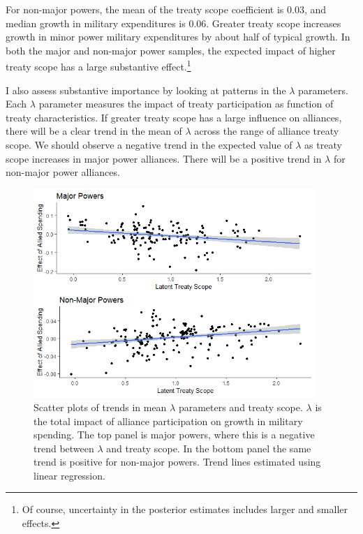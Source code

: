 \documentclass[12pt]{article}
\begin{document}
For non-major powers, the mean of the treaty scope coefficient is 0.03, and median growth in military expenditures is 0.06. 
Greater treaty scope increases growth in minor power military expenditures by about half of typical growth. 
In both the major and non-major power samples, the expected impact of higher treaty scope has a large substantive effect.\footnote{Of course, uncertainty in the posterior estimates includes larger and smaller effects.}


I also assess substantive importance by looking at patterns in the $\lambda$ parameters. 
Each $\lambda$ parameter measures the impact of treaty participation as function of treaty characteristics. 
If greater treaty scope has a large influence on alliances, there will be a clear trend in the mean of $\lambda$ across the range of alliance treaty scope.
We should observe a negative trend in the expected value of $\lambda$ as treaty scope increases in major power alliances. 
There will be a positive trend in $\lambda$ for non-major power alliances. 


\begin{figure}[htbp]
	\centering
		\includegraphics[width=0.95\textwidth]{../figures/lambda-ls-scatter.png}
	\caption{Scatter plots of trends in mean $\lambda$ parameters and treaty scope. $\lambda$ is the total impact of alliance participation on growth in military spending. The top panel is major powers, where this is a negative trend between $\lambda$ and treaty scope. In the bottom panel the same trend is positive for non-major powers. Trend lines estimated using linear regression.}
	\label{fig:lambda-ls-scatter}
\end{figure}
\end{document}
